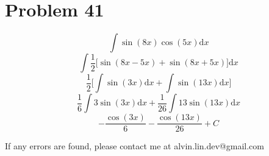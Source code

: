 \documentclass[letterpaper, 12pt]{article}
\newcommand*{\diff}{\mathrm{d}}
\begin{document}
\section*{Problem 41}
\[ \int{\sin(8x)\cos(5x)\diff{x}} \]
\[ \int{\frac{1}{2}\bigg[\sin(8x-5x)+\sin(8x+5x)\bigg]\diff{x}} \]
\[ \frac{1}{2}\bigg[\int{\sin(3x)\diff{x}}+\int{\sin(13x)\diff{x}}\bigg] \]
\[ \frac{1}{6}\int{3\sin(3x)\diff{x}}+\frac{1}{26}\int{13\sin(13x)\diff{x}} \]
\[ -\frac{\cos(3x)}{6}-\frac{\cos(13x)}{26}+C \]

\begin{center}
  If any errors are found, please contact me at alvin.lin.dev@gmail.com
\end{center}
\end{document}
